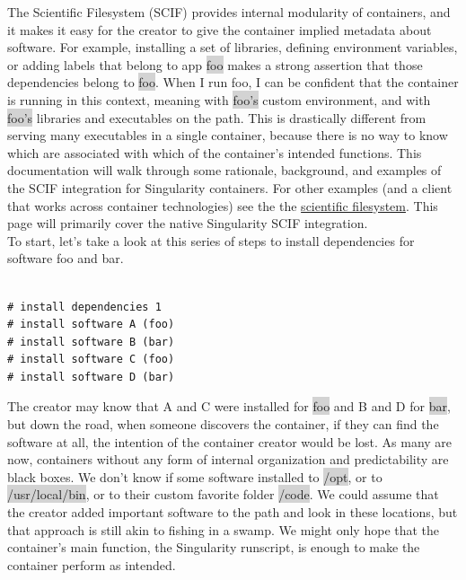 \documentclass[a4paper]{article}
\begin{document}
The Scientific Filesystem (SCIF) provides internal modularity of containers, and it makes it easy for the creator to give the container implied metadata about software. For example, installing a set of libraries, defining environment variables, or adding labels that belong to app \colorbox{lightgray}{foo} makes a strong assertion that those dependencies belong to \colorbox{lightgray}{foo}. When I run foo, I can be confident that the container is running in this context, meaning with \colorbox{lightgray}{foo's} custom environment, and with \colorbox{lightgray}{foo’s} libraries and executables on the path. This is drastically different from serving many executables in a single container, because there is no way to know which are associated with which of the container’s intended functions. This documentation will walk through some rationale, background, and examples of the SCIF integration for Singularity containers. For other examples (and a client that works across container technologies) see the the \href{https://sci-f.github.io/}{scientific filesystem}. This page will primarily cover the native Singularity SCIF integration.\\[0.1in]

To start, let’s take a look at this series of steps to install dependencies for software foo and bar.

\begin{lstlisting}[frame=single] 
%post

# install dependencies 1
# install software A (foo)
# install software B (bar)
# install software C (foo)
# install software D (bar) 
\end{lstlisting}

The creator may know that A and C were installed for \colorbox{lightgray}{foo} and B and D for \colorbox{lightgray}{bar}, but down the road, when someone discovers the container, if they can find the software at all, the intention of the container creator would be lost. As many are now, containers without any form of internal organization and predictability are black boxes. We don’t know if some software installed to \colorbox{lightgray}{/opt}, or to \colorbox{lightgray}{/usr/local/bin}, or to their custom favorite folder \colorbox{lightgray}{/code}. We could assume that the creator added important software to the path and look in these locations, but that approach is still akin to fishing in a swamp. We might only hope that the container’s main function, the Singularity runscript, is enough to make the container perform as intended.
\end{document}
